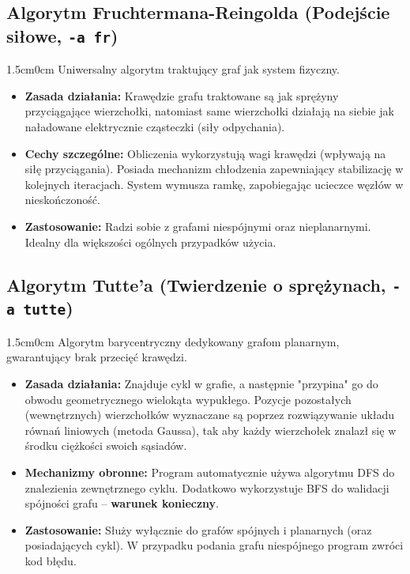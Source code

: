 \documentclass[12pt,a4paper]{article}
\begin{document}
\noindent
\begin{minipage}{\textwidth}
\subsection{Algorytm Fruchtermana-Reingolda (Podejście siłowe, \texttt{-a fr})}
\begin{adjustwidth}{1.5cm}{0cm}
Uniwersalny algorytm traktujący graf jak system fizyczny. 
\begin{itemize}
    \item \textbf{Zasada działania:} Krawędzie grafu traktowane są jak sprężyny przyciągające wierzchołki, natomiast same wierzchołki działają na siebie jak naładowane elektrycznie cząsteczki (siły odpychania).
    \item \textbf{Cechy szczególne:} Obliczenia wykorzystują wagi krawędzi (wpływają na siłę przyciągania). Posiada mechanizm chłodzenia zapewniający stabilizację w kolejnych iteracjach. System wymusza ramkę, zapobiegając ucieczce węzłów w nieskończoność.
    \item \textbf{Zastosowanie:} Radzi sobie z grafami niespójnymi oraz nieplanarnymi. Idealny dla większości ogólnych przypadków użycia.
\end{itemize}
\end{adjustwidth}
\end{minipage}
\vspace{0.5cm}

\noindent
\begin{minipage}{\textwidth}
\subsection{Algorytm Tutte'a (Twierdzenie o sprężynach, \texttt{-a tutte})}
\begin{adjustwidth}{1.5cm}{0cm}
Algorytm barycentryczny dedykowany grafom planarnym, gwarantujący brak przecięć krawędzi.
\begin{itemize}
    \item \textbf{Zasada działania:} Znajduje cykl w grafie, a następnie "przypina" go do obwodu geometrycznego wielokąta wypukłego. Pozycje pozostałych (wewnętrznych) wierzchołków wyznaczane są poprzez rozwiązywanie układu równań liniowych (metoda Gaussa), tak aby każdy wierzchołek znalazł się w środku ciężkości swoich sąsiadów.
    \item \textbf{Mechanizmy obronne:} Program automatycznie używa algorytmu DFS do znalezienia zewnętrznego cyklu. Dodatkowo wykorzystuje BFS do walidacji spójności grafu – \textbf{warunek konieczny}.
    \item \textbf{Zastosowanie:} Służy wyłącznie do grafów spójnych i planarnych (oraz posiadających cykl). W przypadku podania grafu niespójnego program zwróci kod błędu.
\end{itemize}
\end{adjustwidth}
\end{minipage}
\vspace{0.5cm}
\end{document}
